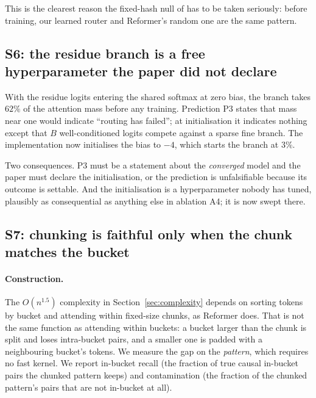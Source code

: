 This is the clearest reason the fixed-hash null of \citet{roller2021hash} has to be taken seriously: before training, our learned router and Reformer's random one are the same pattern.

\subsection{S6: the residue branch is a free hyperparameter the paper did not declare}
\label{sec:s6}

\begin{table}[h]
\centering
\small

\caption{Fraction of attention mass taken by the residue branch at initialisation, against its logit bias ($d=128$, 4 heads, $n=512$, window 8). Prediction P3 assumes a $2$--$25\%$ band; only two of the five settings reach it, and the default of zero is far outside.}
\label{tab:s6}
\end{table}

With the residue logits entering the shared softmax at zero bias, the branch takes $62\%$ of the attention mass before any training. Prediction P3 states that mass near one would indicate ``routing has failed''; at initialisation it indicates nothing except that $B$ well-conditioned logits compete against a sparse fine branch. The implementation now initialises the bias to $-4$, which starts the branch at $3\%$.

Two consequences. P3 must be a statement about the \emph{converged} model and the paper must declare the initialisation, or the prediction is unfalsifiable because its outcome is settable. And the initialisation is a hyperparameter nobody has tuned, plausibly as consequential as anything else in ablation A4; it is now swept there.

\subsection{S7: chunking is faithful only when the chunk matches the bucket}
\label{sec:s7}

\paragraph{Construction.} The $O(n^{1.5})$ complexity in Section~\ref{sec:complexity} depends on sorting tokens by bucket and attending within fixed-size chunks, as Reformer does. That is not the same function as attending within buckets: a bucket larger than the chunk is split and loses intra-bucket pairs, and a smaller one is padded with a neighbouring bucket's tokens. We measure the gap on the \emph{pattern}, which requires no fast kernel. We report in-bucket recall (the fraction of true causal in-bucket pairs the chunked pattern keeps) and contamination (the fraction of the chunked pattern's pairs that are not in-bucket at all).

